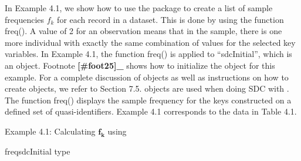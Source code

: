 \documentclass[letterpaper,10pt,english]{sphinxmanual}
\begin{document}
In Example 4.1, we show how to use the  package to create a
list of sample frequencies \(f_{k}\) for each record in a dataset.
This is done by using the  function freq(). A value of 2 for
an observation means that in the sample, there is one more individual
with exactly the same combination of values for the selected key
variables. In Example 4.1, the function freq() is applied to
“sdcInitial”, which is an  object. Footnote {\color{red}\bfseries{}{[}\#foot25{]}\_}
shows how to initialize the  object for
this example. For a complete discussion of  objects as well as
instructions on how to create  objects, we refer to Section
7.5.  objects are used when doing SDC with . The
function freq() displays the sample frequency for the keys constructed
on a defined set of quasi-identifiers. Example 4.1 corresponds to the
data in Table 4.1.

Example 4.1: Calculating \(\mathbf{f}_{\mathbf{k}}\) using 

%
\begin{sphinxVerbatim}[commandchars=\\\{\}]
freqsdcInitial type  
         
\end{sphinxVerbatim}
\end{document}
